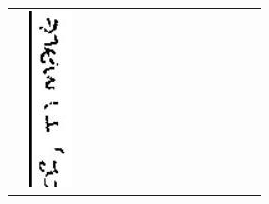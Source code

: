 \documentclass[10pt]{article}
\begin{document}
\begin{center}
\begin{tabular}{|c|c|c|c|c|c|c|c|c|c|c|c|c|c|c|}
 & \includegraphics[max width=\textwidth]{2025_02_27_dd68c3d38de88f0516d9g-009(4)}

\end{tabular}
\end{center}
\end{document}

